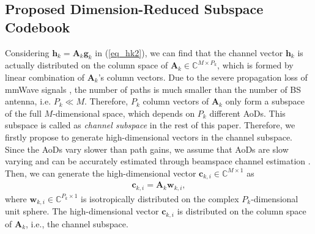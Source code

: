 \documentclass[10pt,twocolumn,twoside]{IEEEtran}
\begin{document}
\subsection{Proposed Dimension-Reduced Subspace Codebook}\label{S3.2}
Considering $\mathbf{h}_k=\mathbf{A}_k\mathbf{g}_k$ in (\ref{eq_hk2}),
we can find that the channel vector $\mathbf{h}_k$ is actually distributed on the column space of $\mathbf{A}_k\in\mathbb{C}^{M\times P_k}$,
which is formed by linear combination of $\mathbf{A}_k$'s column vectors.
Due to the severe propagation loss of mmWave signals \cite{JSSP_AAhmed_EstimationHybrid},
the number of paths is much smaller than the number of BS antenna, i.e. $P_k\ll M$.
Therefore, $P_k$ column vectors of $\mathbf{A}_k$ only form a subspace of the full $M$-dimensional space, which depends on $P_k$ different AoDs.
This subspace is called as \textit{channel subspace} in the rest of this paper.
Therefore, we firstly propose to generate high-dimensional vectors in the channel subspace.
Since the AoDs vary slower than path gains,
we assume that AoDs are slow varying \cite{TVT_HXie_Unified} and can be accurately estimated through beamspace channel estimation \cite{TWC_XGao_BeamspaceChannelEstimation}.
Then, we can generate the high-dimensional vector $\mathbf{c}_{k,i}\in\mathbb{C}^{M\times 1}$ as
\begin{align}\label{eq_cki}
\mathbf{c}_{k,i}=\mathbf{A}_k\mathbf{w}_{k,i},
\end{align}
where $\mathbf{w}_{k,i}\in\mathbb{C}^{P_k\times 1}$ is isotropically distributed on the complex $P_k$-dimensional unit sphere.
The high-dimensional vector $\mathbf{c}_{k,i}$ is distributed on the column space of $\mathbf{A}_k$, i.e., the channel subspace.
\end{document}
